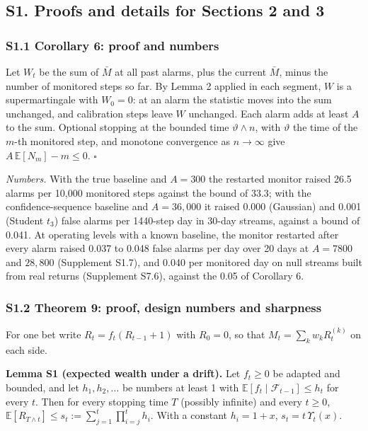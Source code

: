 \documentclass[
]{article}
\begin{document}
\hypertarget{s1.-proofs-and-details-for-sections-2-and-3}{%
\subsection{S1. Proofs and details for Sections 2 and
3}\label{s1.-proofs-and-details-for-sections-2-and-3}}

\hypertarget{s1.1-corollary-6-proof-and-numbers}{%
\subsubsection{S1.1 Corollary 6: proof and
numbers}\label{s1.1-corollary-6-proof-and-numbers}}

Let \(W_t\) be the sum of \(\bar M\) at all past alarms, plus the
current \(\bar M\), minus the number of monitored steps so far. By Lemma
2 applied in each segment, \(W\) is a supermartingale with \(W_0 = 0\):
at an alarm the statistic moves into the sum unchanged, and calibration
steps leave \(W\) unchanged. Each alarm adds at least \(A\) to the sum.
Optional stopping at the bounded time \(\vartheta \wedge n\), with
\(\vartheta\) the time of the \(m\)-th monitored step, and monotone
convergence as \(n \to \infty\) give \(A\,\mathbb{E}[N_m] - m \le 0\).
\(\square\)

\emph{Numbers.} With the true baseline and \(A = 300\) the restarted
monitor raised 26.5 alarms per 10,000 monitored steps against the bound
of 33.3; with the confidence-sequence baseline and \(A = 36{,}000\) it
raised 0.000 (Gaussian) and 0.001 (Student \(t_3\)) false alarms per
1440-step day in 30-day streams, against a bound of 0.041. At operating
levels with a known baseline, the monitor restarted after every alarm
raised 0.037 to 0.048 false alarms per day over 20 days at \(A = 7800\)
and \(28{,}800\) (Supplement S1.7), and 0.040 per monitored day on null
streams built from real returns (Supplement S7.6), against the 0.05 of
Corollary 6.

\hypertarget{s1.2-theorem-9-proof-design-numbers-and-sharpness}{%
\subsubsection{S1.2 Theorem 9: proof, design numbers and
sharpness}\label{s1.2-theorem-9-proof-design-numbers-and-sharpness}}

For one bet write \(R_t = f_t(R_{t-1} + 1)\) with \(R_0 = 0\), so that
\(M_t = \sum_k w_k R_t^{(k)}\) on each side.

\textbf{Lemma S1 (expected wealth under a drift).} Let \(f_t \ge 0\) be
adapted and bounded, and let \(h_1, h_2, \dots\) be numbers at least 1
with \(\mathbb{E}[f_t \mid \mathcal{F}_{t-1}] \le h_t\) for every \(t\).
Then for every stopping time \(T\) (possibly infinite) and every
\(t \ge 0\),
\(\mathbb{E}[R_{T \wedge t}] \le s_t := \sum_{j=1}^{t}\prod_{i=j}^{t} h_i\).
With a constant \(h_i = 1 + x\), \(s_t = t\,\Upsilon_t(x)\).
\end{document}
